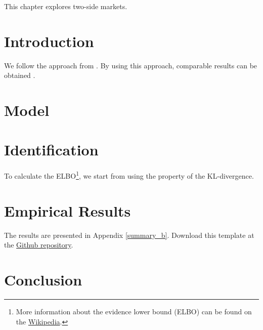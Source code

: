 This chapter explores two-side markets. \lipsum[30]

\section{Introduction}
We follow the approach from \cite{HL2019}. \lipsum[50] By using this approach, comparable results can be obtained \citep{CES2013}.

\section{Model}
\lipsum[53]

\section{Identification}
\lipsum[16] To calculate the ELBO\footnote{More information about the evidence lower bound (ELBO) can be found on the \href{https://en.wikipedia.org/wiki/Evidence_lower_bound}{Wikipedia}. }, we start from using the property of the KL-divergence.


\section{Empirical Results}
The results are presented in Appendix \ref{summary_b}. Download this template at the \href{https://github.com/howardhsumail/Dissertation-Template.git}{Github repository}.

\section{Conclusion}
\lipsum[70]